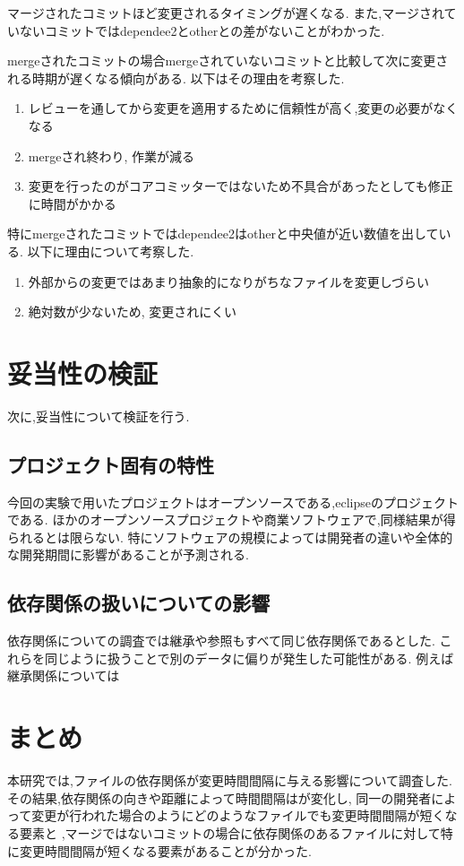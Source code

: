 \documentclass{fose2016}           %
\begin{document}
マージされたコミットほど変更されるタイミングが遅くなる.
また,マージされていないコミットではdependee2とotherとの差がないことがわかった.


mergeされたコミットの場合mergeされていないコミットと比較して次に変更される時期が遅くなる傾向がある.
以下はその理由を考察した.
\begin{enumerate}
\item レビューを通してから変更を適用するために信頼性が高く,変更の必要がなくなる
\item mergeされ終わり, 作業が減る
\item 変更を行ったのがコアコミッターではないため不具合があったとしても修正に時間がかかる
\end{enumerate}

特にmergeされたコミットではdependee2はotherと中央値が近い数値を出している.
以下に理由について考察した.

\begin{enumerate}
\item 外部からの変更ではあまり抽象的になりがちなファイルを変更しづらい
\item 絶対数が少ないため, 変更されにくい
\end{enumerate}

\section{妥当性の検証}\label{妥当性の検証}
次に,妥当性について検証を行う.

\subsection{プロジェクト固有の特性}
今回の実験で用いたプロジェクトはオープンソースである,eclipseのプロジェクトである.
ほかのオープンソースプロジェクトや商業ソフトウェアで,同様結果が得られるとは限らない.
特にソフトウェアの規模によっては開発者の違いや全体的な開発期間に影響があることが予測される.

\subsection{依存関係の扱いについての影響}
依存関係についての調査では継承や参照もすべて同じ依存関係であるとした.
これらを同じように扱うことで別のデータに偏りが発生した可能性がある.
例えば継承関係については

\section{まとめ} \label{まとめ}
本研究では,ファイルの依存関係が変更時間間隔に与える影響について調査した.
その結果,依存関係の向きや距離によって時間間隔はが変化し,
同一の開発者によって変更が行われた場合のようにどのようなファイルでも変更時間間隔が短くなる要素と
,マージではないコミットの場合に依存関係のあるファイルに対して特に変更時間間隔が短くなる要素があることが分かった.
\end{document}
